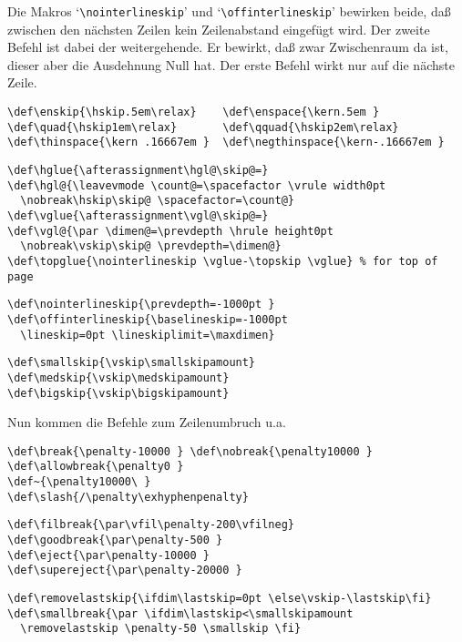 \begin{appendix}
Die Makros `\verb|\nointerlineskip|' und `\verb|\offinterlineskip|'
bewirken beide, da\ss{} zwischen den n\"achsten Zeilen kein
Zeilenabstand
eingef\"ugt wird. Der zweite Befehl ist dabei der weitergehende. Er
bewirkt, da\ss{} zwar Zwischenraum da ist, dieser aber die Ausdehnung Null
hat. Der erste Befehl wirkt nur auf die n\"achste Zeile.
\begin{verbatim}
\def\enskip{\hskip.5em\relax}    \def\enspace{\kern.5em }
\def\quad{\hskip1em\relax}       \def\qquad{\hskip2em\relax}
\def\thinspace{\kern .16667em }  \def\negthinspace{\kern-.16667em }
\end{verbatim}
\begin{verbatim}
\def\hglue{\afterassignment\hgl@\skip@=}
\def\hgl@{\leavevmode \count@=\spacefactor \vrule width0pt
  \nobreak\hskip\skip@ \spacefactor=\count@}
\def\vglue{\afterassignment\vgl@\skip@=}
\def\vgl@{\par \dimen@=\prevdepth \hrule height0pt
  \nobreak\vskip\skip@ \prevdepth=\dimen@}
\def\topglue{\nointerlineskip \vglue-\topskip \vglue} % for top of page
\end{verbatim}
\begin{verbatim}
\def\nointerlineskip{\prevdepth=-1000pt }
\def\offinterlineskip{\baselineskip=-1000pt
  \lineskip=0pt \lineskiplimit=\maxdimen}
\end{verbatim}
\begin{verbatim}
\def\smallskip{\vskip\smallskipamount}
\def\medskip{\vskip\medskipamount}
\def\bigskip{\vskip\bigskipamount}
\end{verbatim}
Nun kommen die Befehle zum Zeilenumbruch u.a.
\begin{verbatim}
\def\break{\penalty-10000 } \def\nobreak{\penalty10000 }
\def\allowbreak{\penalty0 }
\def~{\penalty10000\ }
\def\slash{/\penalty\exhyphenpenalty}
\end{verbatim}
\begin{verbatim}
\def\filbreak{\par\vfil\penalty-200\vfilneg}
\def\goodbreak{\par\penalty-500 }
\def\eject{\par\penalty-10000 }
\def\supereject{\par\penalty-20000 }
\end{verbatim}
\begin{verbatim}
\def\removelastskip{\ifdim\lastskip=0pt \else\vskip-\lastskip\fi}
\def\smallbreak{\par \ifdim\lastskip<\smallskipamount
  \removelastskip \penalty-50 \smallskip \fi}

\end{verbatim}
\end{appendix}

